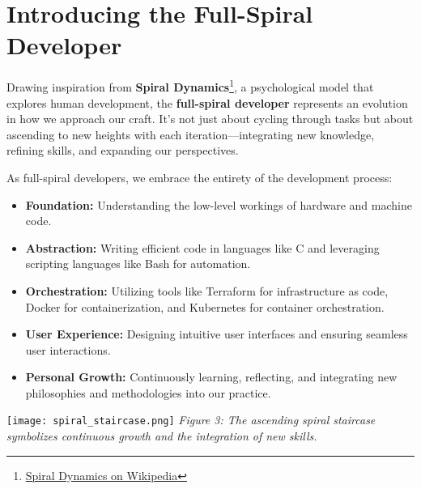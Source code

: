 \documentclass[../../main.tex]{subfiles}
\begin{document}
    \section{Introducing the Full-Spiral Developer}

    Drawing inspiration from \textbf{Spiral Dynamics}\footnote{\href{https://en.wikipedia.org/wiki/Spiral_Dynamics}{Spiral Dynamics on Wikipedia}}, a psychological model that explores human development, the \textbf{full-spiral developer} represents an evolution in how we approach our craft. It's not just about cycling through tasks but about ascending to new heights with each iteration—integrating new knowledge, refining skills, and expanding our perspectives.

    As full-spiral developers, we embrace the entirety of the development process:

    \begin{itemize}
      \item \textbf{Foundation:} Understanding the low-level workings of hardware and machine code.
      \item \textbf{Abstraction:} Writing efficient code in languages like C and leveraging scripting languages like Bash for automation.
      \item \textbf{Orchestration:} Utilizing tools like Terraform for infrastructure as code, Docker for containerization, and Kubernetes for container orchestration.
      \item \textbf{User Experience:} Designing intuitive user interfaces and ensuring seamless user interactions.
      \item \textbf{Personal Growth:} Continuously learning, reflecting, and integrating new philosophies and methodologies into our practice.
    \end{itemize}

    \vspace{0.5cm}
    \noindent\texttt{[image: spiral\_staircase.png]}
    \newline
    \textit{Figure 3: The ascending spiral staircase symbolizes continuous growth and the integration of new skills.}
    \vspace{0.5cm}
\end{document}
